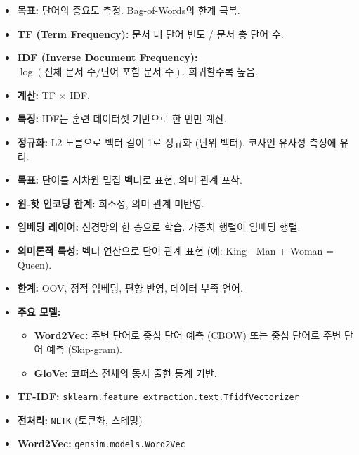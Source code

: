 \documentclass[11pt,a4paper]{article}
\theoremstyle{definition}
\begin{document}
\begin{tcolorbox}[summarybox, title=3. TF-IDF (Term Frequency-Inverse Document Frequency)]
\begin{itemize}
    \item \textbf{목표:} 단어의 중요도 측정. Bag-of-Words의 한계 극복.
    \item \textbf{TF (Term Frequency):} 문서 내 단어 빈도 / 문서 총 단어 수.
    \item \textbf{IDF (Inverse Document Frequency):} $\log(\text{전체 문서 수} / \text{단어 포함 문서 수})$. 희귀할수록 높음.
    \item \textbf{계산:} TF $\times$ IDF.
    \item \textbf{특징:} IDF는 훈련 데이터셋 기반으로 한 번만 계산.
    \item \textbf{정규화:} L2 노름으로 벡터 길이 1로 정규화 (단위 벡터). 코사인 유사성 측정에 유리.
\end{itemize}
\end{tcolorbox}

\begin{tcolorbox}[summarybox, title=4. 단어 임베딩 (Word Embedding)]
\begin{itemize}
    \item \textbf{목표:} 단어를 저차원 밀집 벡터로 표현, 의미 관계 포착.
    \item \textbf{원-핫 인코딩 한계:} 희소성, 의미 관계 미반영.
    \item \textbf{임베딩 레이어:} 신경망의 한 층으로 학습. 가중치 행렬이 임베딩 행렬.
    \item \textbf{의미론적 특성:} 벡터 연산으로 단어 관계 표현 (예: King - Man + Woman = Queen).
    \item \textbf{한계:} OOV, 정적 임베딩, 편향 반영, 데이터 부족 언어.
    \item \textbf{주요 모델:}
        \begin{itemize}
            \item \textbf{Word2Vec:} 주변 단어로 중심 단어 예측 (CBOW) 또는 중심 단어로 주변 단어 예측 (Skip-gram).
            \item \textbf{GloVe:} 코퍼스 전체의 동시 출현 통계 기반.
        \end{itemize}
\end{itemize}
\end{tcolorbox}

\begin{tcolorbox}[summarybox, title=5. 실습 도구]
\begin{itemize}
    \item \textbf{TF-IDF:} \texttt{sklearn.feature\_extraction.text.TfidfVectorizer}
    \item \textbf{전처리:} \texttt{NLTK} (토큰화, 스테밍)
    \item \textbf{Word2Vec:} \texttt{gensim.models.Word2Vec}
\end{itemize}
\end{tcolorbox}
\end{document}
